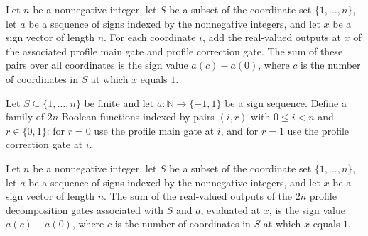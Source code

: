 \begin{theorem}
\label{FABL.sum_profileGate_pair}
\leanok
{}
Let $n$ be a nonnegative integer, let $S$ be a subset of the coordinate set
$\{1,\ldots,n\}$, let $a$ be a sequence of signs indexed by the nonnegative integers,
and let $x$ be a sign vector of length $n$. For each coordinate $i$, add the real-valued
outputs at $x$ of the associated profile main gate and profile correction gate. The sum
of these pairs over all coordinates is the sign value $a(c)-a(0)$, where $c$ is the
number of coordinates in $S$ at which $x$ equals $1$.
\end{theorem}

\begin{definition}
\label{FABL.profileDecompositionGates}
\leanok
{}
Let $S\subseteq\{1,\ldots,n\}$ be finite and let $a\colon\mathbb{N}\to\{−1,1\}$ be a
sign sequence. Define a family of $2n$ Boolean functions indexed by pairs $(i,r)$ with
$0\le i<n$ and $r\in\{0,1\}$: for $r=0$ use the profile main gate at $i$, and for $r=1$
use the profile correction gate at $i$.
\end{definition}

\begin{theorem}
\label{FABL.sum_profileDecompositionGates}
\leanok
{}
Let $n$ be a nonnegative integer, let $S$ be a subset of the coordinate set
$\{1,\ldots,n\}$, let $a$ be a sequence of signs indexed by the nonnegative integers,
and let $x$ be a sign vector of length $n$. The sum of the real-valued outputs of the
$2n$ profile decomposition gates associated with $S$ and $a$, evaluated at $x$, is the
sign value $a(c)-a(0)$, where $c$ is the number of coordinates in $S$ at which $x$
equals $1$.
\end{theorem}

